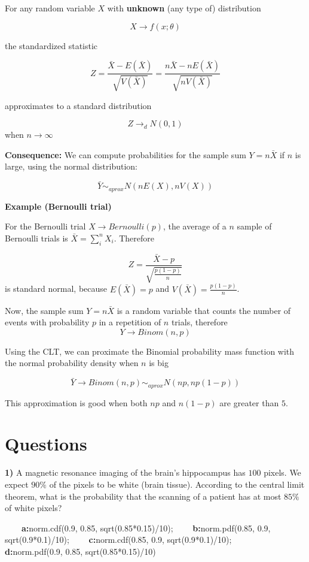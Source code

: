 \documentclass[
]{book}
\begin{document}
For any random variable \(X\) with \textbf{unknown} (any type of) distribution

\[X \rightarrow f(x; \theta)\]

the standardized statistic

\[Z=\frac{\bar{X}-E(\bar{X})}{\sqrt{V(\bar{X})}}=\frac{n\bar{X}-nE(\bar{X})}{\sqrt{nV(\bar{X})}}\]

approximates to a standard distribution

\[Z \rightarrow_d N(0,1)\] when \(n\rightarrow \infty\)

\textbf{Consequence:} We can compute probabilities for the sample sum \(Y=n\bar{X}\) if \(n\) is large, using the normal distribution:

\[\bar{Y} \sim_{aprox}  N(nE(X), nV(X))\]

\textbf{Example (Bernoulli trial)}

For the Bernoulli trial \(X \rightarrow Bernoulli(p)\), the average of a \(n\) sample of Bernoulli trials is \(\bar{X}=\sum_i^n X_i\). Therefore

\[Z=\frac{\bar{X}-p}{\sqrt{\frac{p(1-p)}{n}}}\]
is standard normal, because \(E(\bar{X})=p\) and \(V(\bar{X})=\frac{p(1-p)}{n}\).

Now, the sample sum \(Y=n\bar{X}\) is a random variable that counts the number of events with probability \(p\) in a repetition of \(n\) trials, therefore
\[Y \rightarrow Binom(n, p)\]

Using the CLT, we can proximate the Binomial probability mass function with the normal probability density when \(n\) is big

\[\bar{Y} \rightarrow  Binom(n, p) \sim_{aprox}  N(np, np(1-p))\]

This approximation is good when both \(np\) and \(n(1-p)\) are greater than \(5\).

\hypertarget{questions-8}{%
\section{Questions}\label{questions-8}}

\textbf{1)} A magnetic resonance imaging of the brain's hippocampus has \(100\) pixels. We expect \(90\%\) of the pixels to be white (brain tissue). According to the central limit theorem, what is the probability that the scanning of a patient has at most \(85\%\) of white pixels?

\textbf{\(\qquad\)a:}norm.cdf(0.9, 0.85, sqrt(0.85*0.15)/10); \textbf{\(\qquad\)b:}norm.pdf(0.85, 0.9,
sqrt(0.9*0.1)/10); \textbf{\(\qquad\)c:}norm.cdf(0.85, 0.9, sqrt(0.9*0.1)/10); \textbf{\(\qquad\)d:}norm.pdf(0.9, 0.85, sqrt(0.85*0.15)/10)
\end{document}
